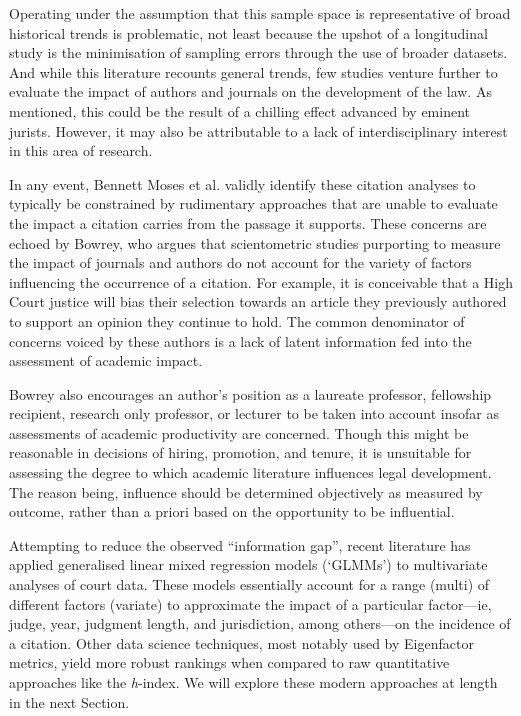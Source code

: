 Operating under the assumption that this sample space is representative of broad historical trends is problematic, not least because the upshot of a longitudinal study is the minimisation of sampling errors through the use of broader datasets. And while this literature recounts general trends, few studies venture further to evaluate the impact of authors and journals on the development of the law. As mentioned, this could be the result of a chilling effect advanced by eminent jurists. However, it may also be attributable to a lack of interdisciplinary interest in this area of research.

In any event, Bennett Moses et al. validly identify these citation analyses to typically be constrained by rudimentary approaches that are unable to evaluate the impact a citation carries from the passage it supports. These concerns are echoed by Bowrey, who argues that scientometric studies purporting to measure the impact of journals and authors do not account for the variety of factors influencing the occurrence of a citation. For example, it is conceivable that a High Court justice will bias their selection towards an article they previously authored to support an opinion they continue to hold. The common denominator of concerns voiced by these authors is a lack of latent information fed into the assessment of academic impact.

Bowrey also encourages an author's position as a laureate professor, fellowship recipient, research only professor, or lecturer to be taken into account insofar as assessments of academic productivity are concerned. Though this might be reasonable in decisions of hiring, promotion, and tenure, it is unsuitable for assessing the degree to which academic literature influences legal development. The reason being, influence should be determined objectively as measured by outcome, rather than a priori based on the opportunity to be influential.

Attempting to reduce the observed ``information gap'', recent literature has applied generalised linear mixed regression models (`GLMMs') to multivariate analyses of court data. These models essentially account for a range (multi) of different factors (variate) to approximate the impact of a particular factor---ie, judge, year, judgment length, and jurisdiction, among others---on the incidence of a citation. Other data science techniques, most notably used by Eigenfactor metrics, yield more robust rankings when compared to raw quantitative approaches like the \textit{h}-index. We will explore these modern approaches at length in the next Section.
